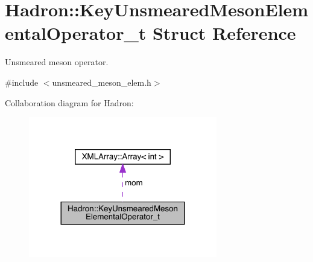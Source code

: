 \hypertarget{structHadron_1_1KeyUnsmearedMesonElementalOperator__t}{}\section{Hadron\+:\+:Key\+Unsmeared\+Meson\+Elemental\+Operator\+\_\+t Struct Reference}
\label{structHadron_1_1KeyUnsmearedMesonElementalOperator__t}


Unsmeared meson operator.  




{\ttfamily \#include $<$unsmeared\+\_\+meson\+\_\+elem.\+h$>$}



Collaboration diagram for Hadron\+:\nopagebreak
\begin{figure}[H]
\begin{center}
\leavevmode
\includegraphics[width=233pt]{df/d59/structHadron_1_1KeyUnsmearedMesonElementalOperator__t__coll__graph}
\end{center}
\end{figure}
